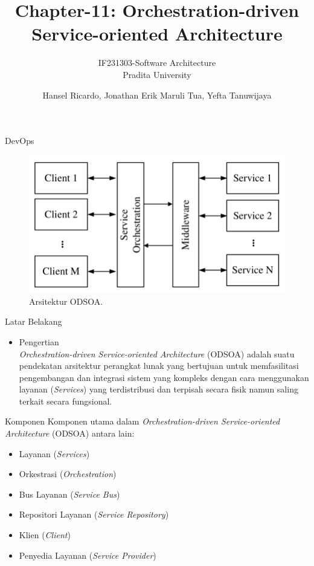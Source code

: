 \documentclass{beamer}
\title{Chapter-11: Orchestration-driven Service-oriented Architecture}
\subtitle{IF231303-Software Architecture\\Pradita University}
\author{Hansel Ricardo, Jonathan Erik Maruli Tua, Yefta Tanuwijaya}
\begin{document}
	
	\begin{frame}[plain]
		\maketitle
	\end{frame}
	
	\begin{frame}{DevOps}
		\begin{figure}[h]
			\centering
			\includegraphics[width=\textwidth]{ODSOA}
			\caption{Arsitektur ODSOA.}
			\label{fig:Arsitektur ODSOA}
		\end{figure}
	\end{frame}
	
	\begin{frame}{Latar Belakang}
		\begin{itemize}
			\item Pengertian
			\\\textit{Orchestration-driven Service-oriented Architecture} (ODSOA) adalah suatu pendekatan arsitektur perangkat lunak yang bertujuan untuk memfasilitasi pengembangan dan integrasi sistem yang kompleks dengan cara menggunakan layanan (\textit{Services}) yang terdistribusi dan terpisah secara fisik namun saling terkait secara fungsional.
		\end{itemize}
	\end{frame}
	
	\begin{frame}{Komponen}
		Komponen utama dalam \textit{Orchestration-driven Service-oriented Architecture} (ODSOA) antara lain:
		\begin{itemize}
			\item Layanan (\textit{Services})
			\item Orkestrasi (\textit{Orchestration})
			\item Bus Layanan (\textit{Service Bus})
			\item Repositori Layanan (\textit{Service Repository})
			\item Klien (\textit{Client})
			\item Penyedia Layanan (\textit{Service Provider})
			
		\end{itemize}
	\end{frame}
	
\end{document}
